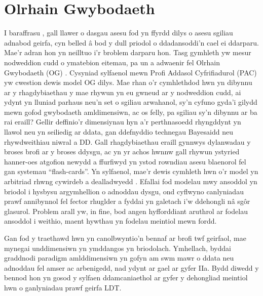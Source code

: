 \section{Olrhain Gwybodaeth}
I baraffrasu \textcite{meara_complexities_1994}, gall llawer o dasgau asesu fod yn ffyrdd dilys o asesu sgiliau adnabod geirfa, cyn belled â bod y dull priodol o ddadansoddi'n cael ei ddarparu. Mae'r adran hon yn neilltuo i'r broblem darparu hon. Tasg gymhleth yw mesur nodweddion cudd o ymatebion eitemau, pa un a adwaenir fel Olrhain Gwybodaeth (OG) \parencite{shen_survey_2024}. Cysyniad sylfaenol mewn Profi Addasol Cyfrifiadurol (PAC) yw cwestion dewis model OG dilys. Mae rhan o'r cymhlethdod hwn yn dibynnu ar y rhagdybiaethau y mae rhywun yn eu gwneud ar y nodweddion cudd, ai ydynt yn lluniad parhaus neu'n set o sgiliau arwahanol, sy'n cyfuno gyda'i gilydd mewn gofod gwybodaeth amldimensiwn, ac os felly, pa sgiliau sy'n dibynnu ar ba rai eraill? Gellir deffinio'r dimensiynau hyn a'r perthnasoedd rhyngddynt yn llawol neu yn seiliedig ar ddata, gan ddefnyddio technegau Bayesaidd neu rhywdweithiau niwral a DD\@. Gall rhagdybiaethau eraill gynnwys dylanwadau y broses brofi ar y broses ddysgu, ac yn yr achos hwnnw gall rhywun ystyried hanner-oes atgofion newydd a ffurfiwyd yn ystod rowndiau asesu blaenorol fel gan systemau ``flash-cards''. Yn sylfaenol, mae'r dewis cymhleth hwn o'r model yn arbitriad rhwng cywirdeb a dealladwyedd \parencite{pelanek_adaptive_2025}. Efallai fod modelau mwy ansoddol yn briodol i hysbysu argymhellion o adnoddau dysgu, ond cyflwyno canlyniadau prawf annibynnol fel fector rhuglder a fyddai yn galetach i'w ddehongli nâ sgôr glasurol. Problem arall yw, in fine, bod angen hyfforddiant aruthrol ar fodelau ansoddol i weithio, maent hywthau yn fodelau meintiol mewn fordd.

Gan fod y traethawd hwn yn canolbwyntio'n bennaf ar brofi twf geirfaol, mae mynegai unddimensiwn yn ymddangos yn briodolach. Ymhellach, byddai graddnodi paradigm amlddimensiwn yn gofyn am swm mawr o ddata neu adnoddau fel amser ac arbenigedd, nad ydynt ar gael ar gyfer IIa\@. Bydd diwedd y bennod hon yn gosod y sylfaen ddamcaniaethol ar gyfer y dehongliad meintiol hwn o ganlyniadau prawf geirfa LDT\@.

